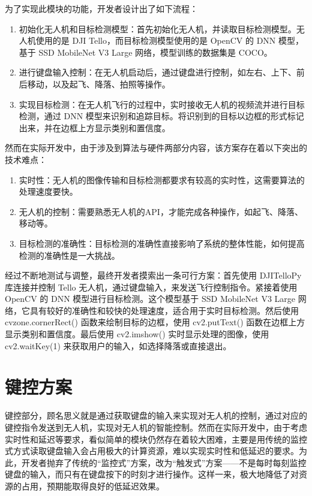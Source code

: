 \documentclass[report, twoside, UTF8, AutoFakeBold = 1, AutoFakeSlant, zihao = -4]{config}
\begin{document}
为了实现此模块的功能，开发者设计出了如下流程：
\begin{enumerate}
    \item 初始化无人机和目标检测模型：首先初始化无人机，并读取目标检测模型。无人机使用的是 DJI Tello，而目标检测模型使用的是 OpenCV 的 DNN 模型，基于 SSD MobileNet V3 Large 网络，模型训练的数据集是 COCO。
    \item 进行键盘输入控制：在无人机启动后，通过键盘进行控制，如左右、上下、前后移动，以及起飞、降落、拍照等操作。
    \item 实现目标检测：在无人机飞行的过程中，实时接收无人机的视频流并进行目标检测，通过 DNN 模型来识别和追踪目标。将识别到的目标以边框的形式标记出来，并在边框上方显示类别和置信度。
\end{enumerate}

然而在实际开发中，由于涉及到算法与硬件两部分内容，该方案存在着以下突出的技术难点：
\begin{enumerate}
    \item 实时性：无人机的图像传输和目标检测都要求有较高的实时性，这需要算法的处理速度要快。
    \item 无人机的控制：需要熟悉无人机的API，才能完成各种操作，如起飞、降落、移动等。
    \item 目标检测的准确性：目标检测的准确性直接影响了系统的整体性能，如何提高检测的准确性是一大挑战。
\end{enumerate}

经过不断地测试与调整，最终开发者摸索出一条可行方案：首先使用 DJITelloPy 库连接并控制 Tello 无人机，通过键盘输入，来发送飞行控制指令。紧接着使用 OpenCV 的 DNN 模型进行目标检测。这个模型基于 SSD MobileNet V3 Large 网络，它具有较好的准确性和较快的处理速度，适合用于实时目标检测。然后使用 cvzone.cornerRect() 函数来绘制目标的边框，使用 cv2.putText() 函数在边框上方显示类别和置信度。最后使用 cv2.imshow() 实时显示处理的图像，使用 cv2.waitKey(1) 来获取用户的输入，如选择降落或直接退出。

\section{键控方案}
键控部分，顾名思义就是通过获取键盘的输入来实现对无人机的控制，通过对应的键控指令发送到无人机，实现对无人机的智能控制。然而在实际开发中，由于考虑实时性和延迟等要求，看似简单的模块仍然存在着较大困难，主要是用传统的监控式方式读取键盘输入会占用极大的计算资源，难以实现实时性和低延迟的要求。为此，开发者抛弃了传统的“监控式”方案，改为“触发式”方案——不是每时每刻监控键盘的输入，而只有在键盘按下的时刻才进行操作。这样一来，极大地降低了对资源的占用，预期能取得良好的低延迟效果。
\end{document}
